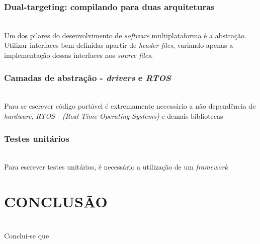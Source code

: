 \documentclass[times, twoside, watermark]{artigo}
\begin{document}
\subsubsection{Dual-targeting: compilando para duas arquiteturas}\hfill\\

Um dos pilares do desenvolvimento de \textit{software} multiplataforma é a abstração.
Utilizar interfaces bem definidas apartir de \textit{header files}, variando apenas
a implementação dessas interfaces nos \textit{source files}.

\subsubsection{Camadas de abstração - \textit{drivers} e \textit{RTOS}}\hfill\\

Para se escrever código portável é extremamente necessário a não dependência de 
\textit{hardware}, \textit{RTOS - (Real Time Operating Systems)} e demais bibliotecas

\subsubsection{Testes unitários}\hfill\\

Para escrever testes unitários, é necessário a utilização de um \textit{framework}


\section{CONCLUSÃO}\hfill\\
Conclui-se que 



\end{document}
